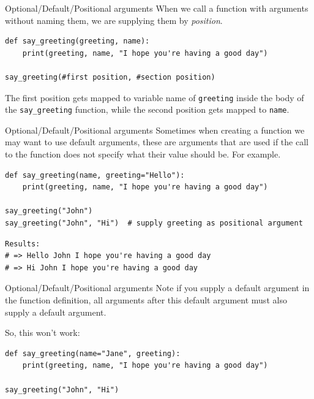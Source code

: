 \documentclass[10pt]{beamer}
\begin{document}
\begin{frame}[label={sec:orgf408f17},fragile]{Optional/Default/Positional arguments}
 When we call a function with arguments without naming them, we are supplying them by
\emph{position}.

\begin{verbatim}
def say_greeting(greeting, name):
    print(greeting, name, "I hope you're having a good day")

say_greeting(#first position, #section position)
\end{verbatim}

The first position gets mapped to variable name of \texttt{greeting} inside the body of the
\texttt{say\_greeting} function, while the second position gets mapped to \texttt{name}. 
\end{frame}

\begin{frame}[label={sec:org2641017},fragile]{Optional/Default/Positional arguments}
 Sometimes when creating a function we may want to use default arguments, these are
arguments that are used if the call to the function does not specify what their value
should be. For example.

\begin{verbatim}
def say_greeting(name, greeting="Hello"):
    print(greeting, name, "I hope you're having a good day")

say_greeting("John")
say_greeting("John", "Hi")  # supply greeting as positional argument
\end{verbatim}

\begin{verbatim}
Results: 
# => Hello John I hope you're having a good day
# => Hi John I hope you're having a good day
\end{verbatim}
\end{frame}

\begin{frame}[label={sec:org39da1ad},fragile]{Optional/Default/Positional arguments}
 \alert{Note} if you supply a default argument in the function definition, all arguments after
this default argument must also supply a default argument.

So, this \alert{won't} work:

\begin{verbatim}
def say_greeting(name="Jane", greeting):
    print(greeting, name, "I hope you're having a good day")

say_greeting("John", "Hi")
\end{verbatim}
\end{frame}
\end{document}
